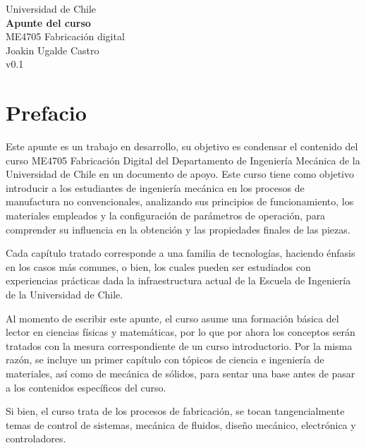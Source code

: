 \documentclass[12pt,letter,oneside]{book}
\numberwithin{equation}{chapter}
\numberwithin{figure}{chapter}
\numberwithin{table}{chapter}
\begin{document}
\begin{titlepage}
    \centering
     \vspace*{\fill}
    {\Large Universidad de Chile}\\[1cm]
    {\Huge \textbf{Apunte del curso}}\\[0.5cm]
    {\LARGE ME4705 Fabricación digital}\\[2cm]
    {\large Joakin Ugalde Castro}\\
    {\large v0.1}\\[4cm]
    \vfill
\end{titlepage}

\tableofcontents
\chapter*{Prefacio}

Este apunte es un trabajo en desarrollo, su objetivo es condensar el contenido del curso ME4705 Fabricación Digital del Departamento de Ingeniería Mecánica de la Universidad de Chile en un documento de apoyo. Este curso tiene como objetivo introducir a los estudiantes de ingeniería mecánica en los procesos de manufactura no convencionales, analizando sus principios de funcionamiento, los materiales empleados y la configuración de parámetros de operación, para comprender su influencia en la obtención y las propiedades finales de las piezas.

Cada capítulo tratado corresponde a una familia de tecnologías, haciendo énfasis en los casos más comunes, o bien, los cuales pueden ser estudiados con experiencias prácticas dada la infraestructura actual de la Escuela de Ingeniería de la Universidad de Chile.

Al momento de escribir este apunte, el curso asume una formación básica del lector en ciencias físicas y matemáticas, por lo que por ahora los conceptos serán tratados con la mesura correspondiente de un curso introductorio. Por la misma razón, se incluye un primer capítulo con tópicos de ciencia e ingeniería de materiales, así como de mecánica de sólidos, para sentar una base antes de pasar a los contenidos específicos del curso.

Si bien, el curso trata de los procesos de fabricación, se tocan tangencialmente temas de control de sistemas, mecánica de fluidos, diseño mecánico, electrónica y controladores.










\end{document}
